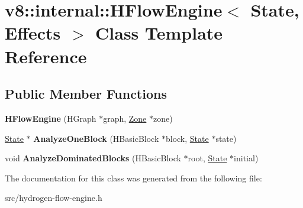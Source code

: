 \hypertarget{classv8_1_1internal_1_1_h_flow_engine}{}\section{v8\+:\+:internal\+:\+:H\+Flow\+Engine$<$ State, Effects $>$ Class Template Reference}
\label{classv8_1_1internal_1_1_h_flow_engine}
\subsection*{Public Member Functions}
\begin{DoxyCompactItemize}
\item 
\hypertarget{classv8_1_1internal_1_1_h_flow_engine_a6bc48f0a65c7b2bb720e2853ac0e88c0}{}{\bfseries H\+Flow\+Engine} (H\+Graph $\ast$graph, \hyperlink{classv8_1_1internal_1_1_zone}{Zone} $\ast$zone)\label{classv8_1_1internal_1_1_h_flow_engine_a6bc48f0a65c7b2bb720e2853ac0e88c0}

\item 
\hypertarget{classv8_1_1internal_1_1_h_flow_engine_a3118e6c3d5976252af3d83378ef2d6ef}{}\hyperlink{classv8_1_1internal_1_1_state}{State} $\ast$ {\bfseries Analyze\+One\+Block} (H\+Basic\+Block $\ast$block, \hyperlink{classv8_1_1internal_1_1_state}{State} $\ast$state)\label{classv8_1_1internal_1_1_h_flow_engine_a3118e6c3d5976252af3d83378ef2d6ef}

\item 
\hypertarget{classv8_1_1internal_1_1_h_flow_engine_a7edf559db3455737a9dcfbe17a288706}{}void {\bfseries Analyze\+Dominated\+Blocks} (H\+Basic\+Block $\ast$root, \hyperlink{classv8_1_1internal_1_1_state}{State} $\ast$initial)\label{classv8_1_1internal_1_1_h_flow_engine_a7edf559db3455737a9dcfbe17a288706}

\end{DoxyCompactItemize}


The documentation for this class was generated from the following file\+:\begin{DoxyCompactItemize}
\item 
src/hydrogen-\/flow-\/engine.\+h\end{DoxyCompactItemize}
